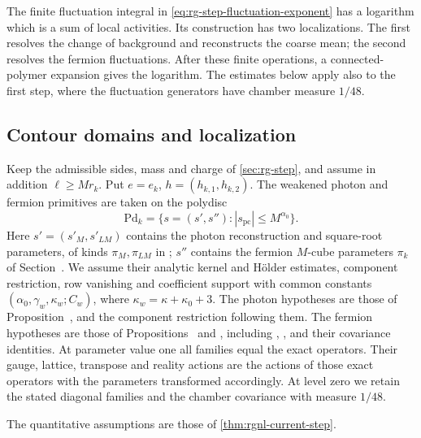 The finite fluctuation integral in
\eqref{eq:rg-step-fluctuation-exponent} has a logarithm which is a
sum of local activities. Its construction has two localizations.
The first resolves the change of background and reconstructs
the coarse mean; the second resolves the fermion fluctuations.
After these finite operations, a connected-polymer expansion
gives the logarithm. The estimates below apply also to the first
step, where the fluctuation generators have chamber measure
$1/48$.

\subsection{Contour domains and localization}
\label{subsec:rgnl-domains}

Keep the admissible sides, mass and charge of
\cref{sec:rg-step}, and assume in addition
$\ell\ge Mr_k$. Put $e=e_k$, $h=(h_{k,1},h_{k,2})$.
The weakened photon and fermion primitives are taken on the
polydisc
\[
 \mathrm{Pd}_k=\{s=(s',s''):|s_{\mathrm{pc}}|\le M^{\alpha_0}\}.
\]
Here $s'=(s'_M,s'_{LM})$ contains the photon reconstruction
and square-root parameters, of kinds $\pi_M,\pi_{LM}$ in
; $s''$ contains the
fermion $M$-cube parameters $\pi_k$ of
Section~.
We assume their analytic kernel and H\"older estimates,
component restriction, row vanishing and coefficient support
with common constants $(\alpha_0,\gamma_w,\kappa_w;C_w)$,
where $\kappa_w=\kappa+\kappa_0+3$.
The photon hypotheses are those of
Proposition~,
 and the component
restriction following them. The fermion hypotheses are those of
Propositions~ and
, including
,
, and their covariance
identities. At parameter value one all families equal the
exact operators. Their gauge, lattice, transpose and reality
actions are the actions of those exact operators with the
parameters transformed accordingly. At level zero we retain
the stated diagonal families and the chamber covariance
with measure $1/48$.

The quantitative assumptions are those of \cref{thm:rgnl-current-step}.

